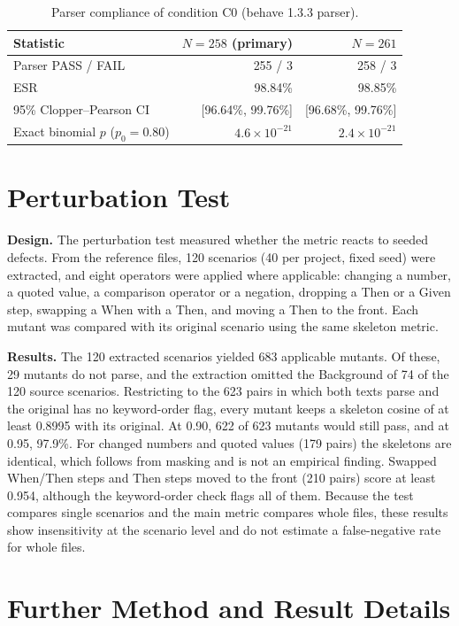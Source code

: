 \begin{table}[H]
\centering
\caption{Parser compliance of condition C0 (behave 1.3.3 parser).}
\label{tab:rq2}
\begin{tabular}{lrr}
\hline
Statistic & $N = 258$ (primary) & $N = 261$\\
\hline
Parser PASS / FAIL & 255 / 3 & 258 / 3\\
ESR & 98.84\% & 98.85\%\\
95\% Clopper--Pearson CI & [96.64\%, 99.76\%] & [96.68\%, 99.76\%]\\
Exact binomial $p$ ($p_0 = 0.80$) & $4.6 \times 10^{-21}$ & $2.4 \times 10^{-21}$\\
\hline
\end{tabular}
\end{table}


\section{Perturbation Test}
\label{app:perturb}

\textbf{Design.} The perturbation test measured whether the metric reacts to seeded defects. From the reference files, 120 scenarios (40 per project, fixed seed) were extracted, and eight operators were applied where applicable: changing a number, a quoted value, a comparison operator or a negation, dropping a Then or a Given step, swapping a When with a Then, and moving a Then to the front. Each mutant was compared with its original scenario using the same skeleton metric.

\textbf{Results.} The 120 extracted scenarios yielded 683 applicable mutants. Of these, 29 mutants do not parse, and the extraction omitted the Background of 74 of the 120 source scenarios. Restricting to the 623 pairs in which both texts parse and the original has no keyword-order flag, every mutant keeps a skeleton cosine of at least 0.8995 with its original. At 0.90, 622 of 623 mutants would still pass, and at 0.95, 97.9\%. For changed numbers and quoted values (179 pairs) the skeletons are identical, which follows from masking and is not an empirical finding. Swapped When/Then steps and Then steps moved to the front (210 pairs) score at least 0.954, although the keyword-order check flags all of them. Because the test compares single scenarios and the main metric compares whole files, these results show insensitivity at the scenario level and do not estimate a false-negative rate for whole files.

\section{Further Method and Result Details}
\label{app:more}

